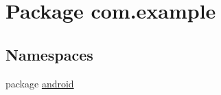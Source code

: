 \hypertarget{namespacecom_1_1example}{\section{Package com.\-example}
\label{namespacecom_1_1example}
}
\subsection*{Namespaces}
\begin{DoxyCompactItemize}
\item 
package \hyperlink{namespacecom_1_1example_1_1android}{android}
\end{DoxyCompactItemize}
